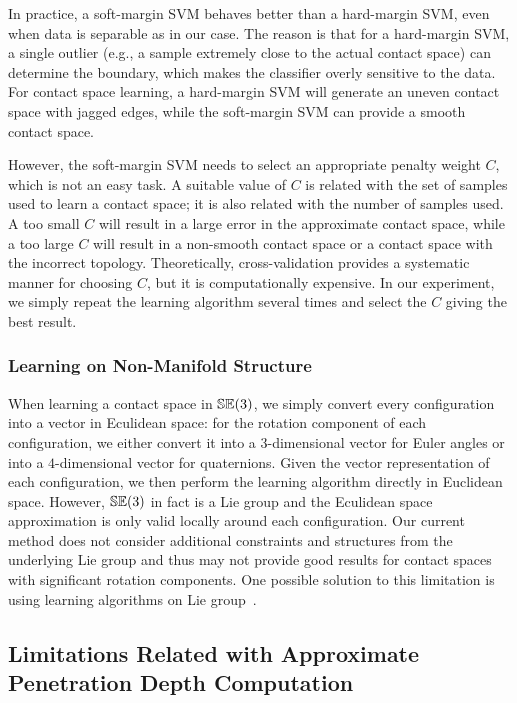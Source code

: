 In practice, a soft-margin SVM behaves better than a hard-margin SVM, even when data is separable as in our case. The reason is that for a hard-margin SVM, a single outlier (e.g., a sample extremely close to the actual contact space) can determine the boundary, which makes the classifier overly sensitive to the data. For contact space learning, a hard-margin SVM will generate an uneven contact space with jagged edges, while the soft-margin SVM can provide a smooth contact space. 

However, the soft-margin SVM needs to select an appropriate penalty weight $C$, which is not an easy task. A suitable value of $C$ is related with the set of samples used to learn a contact space; it is also related with the number of samples used. A too small $C$ will result in a large error in the approximate contact space, while a too large $C$ will result in a non-smooth contact space or a contact space with the incorrect topology. Theoretically, cross-validation provides a systematic manner for choosing $C$, but it is computationally expensive. In our experiment, we simply repeat the learning algorithm several times and select the $C$ giving the best result.

\subsubsection{Learning on Non-Manifold Structure}
When learning a contact space in $\mathbb {SE}(3)$, we simply convert every configuration into a vector in Eculidean space: for the rotation component of each configuration, we either convert it into a $3$-dimensional vector for Euler angles or into a $4$-dimensional vector for quaternions. Given the vector representation of each configuration, we then perform the learning algorithm directly in Euclidean space. However, $\mathbb {SE}(3)$ in fact is a Lie group and the Eculidean space approximation is only valid locally around each configuration. Our current method does not consider additional constraints and structures from the underlying Lie group and thus may not provide good results for contact spaces with significant rotation components. One possible solution to this limitation is using learning algorithms on Lie group~\cite{Tuzel:2008:LLG}.

\subsection{Limitations Related with Approximate Penetration Depth Computation}

